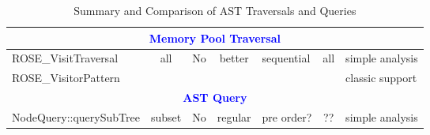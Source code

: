 \begin{table}[htbp]
{\begin{tabular}{||l|c|p{1.0in}|c|p{0.8in}|c|p{1.0in}||}
 \multicolumn{7}{||c||}{\textbf{\textcolor{blue}{Memory Pool Traversal}}} \\\hline \hline
ROSE\_VisitTraversal & all & No  & better  & sequential & all & simple
analysis  \\
\cline{1-1} \cline{7-7}
ROSE\_VisitorPattern &  & & &  & & classic support \\ \hline

 \multicolumn{7}{||c||}{\textbf{\textcolor{blue}{AST Query}}} \\\hline \hline
  NodeQuery::querySubTree& subset & No & regular & pre order? & ?? &
  simple analysis \\ \hline


\end{tabular}
}
\caption{Summary and Comparison of AST Traversals and Queries}
\label{tab:sumTraversal}
\end{table}



